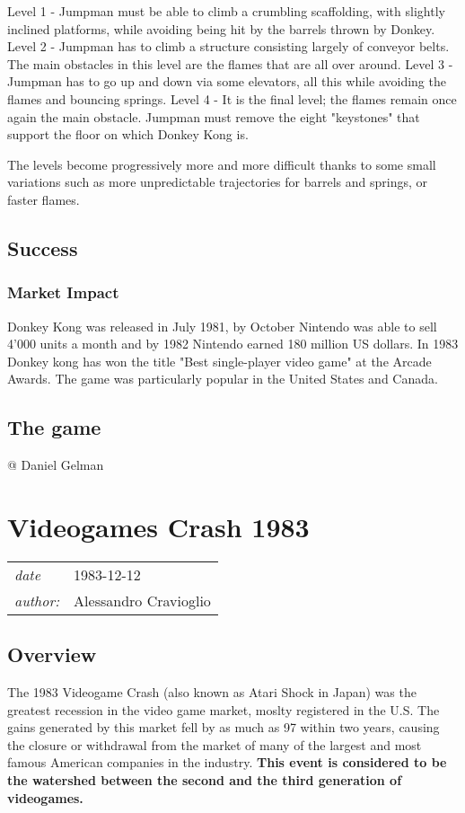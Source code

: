 \documentclass[a4paper,10pt]{book}
\newcommand{\pageHeader}[4]{
    \section{#1}
    \vspace{-0.3cm}
    \begin{table}[h!]
     \begin{tabular}{ll}
        \hline
        \textit{date} & #2 \\
        \textit{author: } & #3\\
        \hline
     \end{tabular}
    \end{table}
    \vspace{-0.3cm}
}
\begin{document}
 Level 1 - Jumpman must be able to climb a crumbling scaffolding, with slightly inclined platforms, while avoiding being hit by the barrels thrown by Donkey.  
 Level 2 - Jumpman has to climb a structure consisting largely of conveyor belts. The main obstacles in this level are the flames that are all over around. 
 Level 3 - Jumpman has to go up and down via some elevators, all this while avoiding the flames and bouncing springs.  
 Level 4 - It is the final level; the flames remain once again the main obstacle. Jumpman must remove the eight "keystones" that support the floor on which Donkey Kong is. 
 
                The levels become progressively more and more difficult thanks to some small variations such as more unpredictable trajectories for barrels and springs, or faster flames.  
 
 \subsection{Success }
 \subsubsection{Market Impact }
            Donkey Kong was released in July 1981, by October Nintendo was able to sell 4'000 units a month and by 1982 Nintendo earned 180 million US dollars. In 1983 Donkey kong has won the title "Best single-player video game" at the Arcade Awards. The game was
            particularly popular in the United States and Canada.
               \textbf{}   \textit{}
 
 \subsection{The game }
 
 
 
 
 @ Daniel Gelman 
 
 
 \newpage\pageHeader{Videogames Crash 1983}{1983-12-12}{Alessandro Cravioglio}{The Videogames Crash is the event that ended the second generation}
 \subsection{Overview }
        The 1983 Videogame Crash (also known as Atari Shock in Japan) was the greatest recession in the video
        game market, moslty registered in the U.S. The gains generated by this market fell by as much as 97 within two years, causing the closure or
        withdrawal from the market of many of the largest and most famous American companies in the industry.  \textbf{This
        event is considered to be the watershed between the second and the third generation of videogames. } 
\end{document}
